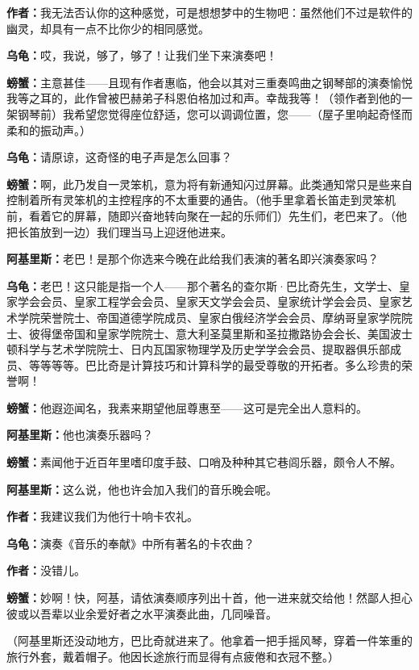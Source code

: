 \documentclass[
  12pt,
  twoside,
  openright,
  oldfontcommands,
]{memoir}
\newcommand{\kaitismall}[1]{{\kaitifamily\small #1}}
\newcommand{\dialogname}[1]{{\heifamily\bfseries #1}}
\begin{document}
\dialogname{作者：}我无法否认你的这种感觉，可是想想梦中的生物吧：虽然他们不过是软件的幽灵，却具有一点不比你少的相同感觉。

\dialogname{乌龟：}哎，我说，够了，够了！让我们坐下来演奏吧！

\dialogname{螃蟹：}主意甚佳------且现有作者惠临，他会以其对三重奏鸣曲之钢琴部的演奏愉悦我等之耳的，此作曾被巴赫弟子科恩伯格加过和声。幸哉我等！\kaitismall{（领作者到他的一架钢琴前）}我希望您觉得座位舒适，您可以调调位置，您------\kaitismall{（屋子里响起奇怪而柔和的振动声。）}

\dialogname{乌龟：}请原谅，这奇怪的电子声是怎么回事？

\dialogname{螃蟹：}啊，此乃发自一灵笨机，意为将有新通知闪过屏幕。此类通知常只是些来自控制着所有灵笨机的主控程序的不太重要的通告。\kaitismall{（他手里拿着长笛走到灵笨机前，看着它的屏幕，随即兴奋地转向聚在一起的乐师们）}先生们，老巴来了。\kaitismall{（他把长笛放到一边）}我们理当马上迎迓他进来。

\dialogname{阿基里斯：}老巴！是那个你选来今晚在此给我们表演的著名即兴演奏家吗？

\dialogname{乌龟：}老巴！这只能是指一个人------那个著名的查尔斯·巴比奇先生，文学士、皇家学会会员、皇家工程学会会员、皇家天文学会会员、皇家统计学会会员、皇家艺术学院荣誉院士、帝国道德学院成员、皇家白俄经济学会会员、摩纳哥皇家学院院士、彼得堡帝国和皇家学院院士、意大利圣莫里斯和圣拉撒路协会会长、美国波士顿科学与艺术学院院士、日内瓦国家物理学及历史学学会会员、提取器俱乐部成员、等等等等。巴比奇是计算技巧和计算科学的最受尊敬的开拓者。多么珍贵的荣誉啊！

\dialogname{螃蟹：}他遐迩闻名，我素来期望他屈尊惠至------这可是完全出人意料的。

\dialogname{阿基里斯：}他也演奏乐器吗？

\dialogname{螃蟹：}素闻他于近百年里嗜印度手鼓、口哨及种种其它巷闾乐器，颇令人不解。

\dialogname{阿基里斯：}这么说，他也许会加入我们的音乐晚会呢。

\dialogname{作者：}我建议我们为他行十响卡农礼。

\dialogname{乌龟：}演奏《音乐的奉献》中所有著名的卡农曲？

\dialogname{作者：}没错儿。

\dialogname{螃蟹：}妙啊！快，阿基，请依演奏顺序列出十首，他一进来就交给他！然鄙人担心彼或以吾辈以业余爱好者之水平演奏此曲，几同噪音。

（阿基里斯还没动地方，巴比奇就进来了。他拿着一把手摇风琴，穿着一件笨重的旅行外套，戴着帽子。他因长途旅行而显得有点疲倦和衣冠不整。）
\end{document}
